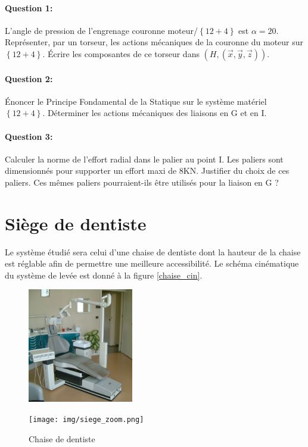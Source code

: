 \paragraph{Question 1:} L'angle de pression de l'engrenage couronne moteur/$\left\{12+4\right\}$ est $\alpha=20$\textdegree.
Représenter, par un torseur, les actions mécaniques de la couronne du moteur sur $\left\{12+4\right\}$.
Écrire les composantes de ce torseur dans $(H,(\overrightarrow{x},\overrightarrow{y},\overrightarrow{z}))$.

\paragraph{Question 2:} Énoncer le Principe Fondamental de la Statique sur le système matériel $\left\{12+4\right\}$. Déterminer les actions mécaniques des liaisons en G et en I.

\paragraph{Question 3:} Calculer la norme de l'effort radial dans le palier au point I. Les paliers sont dimensionnés pour supporter un effort maxi de 8KN. Justifier du choix de ces paliers. Ces mêmes paliers pourraient-ils être utilisés pour la liaison en G ?

\newpage



%


\newpage

\section{Siège de dentiste}

Le système étudié sera celui d'une chaise de dentiste dont la hauteur de la chaise est réglable afin de permettre une meilleure accessibilité. Le schéma cinématique du système de levée est donné à la figure \ref{chaise_cin}.

\begin{figure}[!h]
 \begin{minipage}{0.45\linewidth}
 \centering\includegraphics[height=50mm]{img/siege.png}
 \end{minipage}
 \hfill
 \begin{minipage}{0.45\linewidth}
 \centering\texttt{[image: img/siege\_zoom.png]}
 \end{minipage}
 \caption{Chaise de dentiste}
\end{figure}

